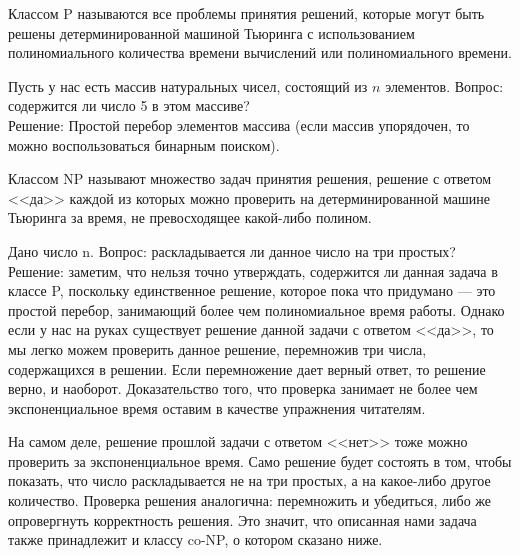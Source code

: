     
    
    \begin{Def} 
        Классом P называются все проблемы принятия решений, которые могут быть решены детерминированной машиной Тьюринга с использованием полиномиального количества времени вычислений или полиномиального времени.
    \end{Def}
    
    \begin{Example}
        Пусть у нас есть массив натуральных чисел, состоящий из $n$ элементов. Вопрос: содержится ли число 5 в этом массиве?\\
        Решение: Простой перебор элементов массива (если массив упорядочен, то можно воспользоваться бинарным поиском).
    \end{Example}
    
    \begin{Def}
        Классом NP называют множество задач принятия решения, решение с ответом <<да>> каждой из которых можно проверить на детерминированной машине Тьюринга за время, не превосходящее какой-либо полином.
    \end{Def}
    
    \begin{Example} 
        Дано число n. Вопрос: раскладывается ли данное число на три простых?\\
        Решение: заметим, что нельзя точно утверждать, содержится ли данная задача в классе P, поскольку единственное решение, которое пока что придумано --- это простой перебор, занимающий более чем полиномиальное время работы. Однако если у нас на руках существует решение данной задачи с ответом <<да>>, то мы легко можем проверить данное решение, перемножив три числа, содержащихся в решении. Если перемножение дает верный ответ, то решение верно, и наоборот. Доказательство того, что проверка занимает не более чем экспоненциальное время оставим в качестве упражнения читателям.
    \end{Example}
    
    \begin{Rem}
        На самом деле, решение прошлой задачи с ответом <<нет>> тоже можно проверить за экспоненциальное время. Само решение будет состоять в том, чтобы показать, что число раскладывается не на три простых, а на какое-либо другое количество. Проверка решения аналогична: перемножить и убедиться, либо же опровергнуть корректность решения. Это значит, что описанная нами задача также принадлежит и классу co-NP, о котором сказано ниже.
    \end{Rem}
    
